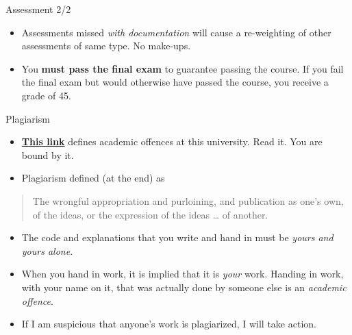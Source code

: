 \documentclass[
  ignorenonframetext,
]{beamer}
\begin{document}
\begin{frame}{Assessment 2/2}
\protect\hypertarget{assessment-22}{}

\begin{itemize}
\item
  Assessments missed \emph{with documentation} will cause a re-weighting
  of other assessments of same type. No make-ups.
\item
  You \textbf{must pass the final exam} to guarantee passing the course.
  If you fail the final exam but would otherwise have passed the course,
  you receive a grade of 45.
\end{itemize}

\end{frame}

\begin{frame}{Plagiarism}
\protect\hypertarget{plagiarism}{}

\begin{itemize}
\item
  \href{http://www.utoronto.ca/academicintegrity/academicoffenses.html}{\textbf{This
  link}} defines academic offences at this university. Read it. You are
  bound by it.
\item
  Plagiarism defined (at the end) as
\end{itemize}

\begin{quote}
The wrongful appropriation and purloining, and publication as one's own,
of the ideas, or the expression of the ideas \ldots{} of another.
\end{quote}

\begin{itemize}
\item
  The code and explanations that you write and hand in must be
  \emph{yours and yours alone}.
\item
  When you hand in work, it is implied that it is \emph{your} work.
  Handing in work, with your name on it, that was actually done by
  someone else is an \emph{academic offence}.
\item
  If I am suspicious that anyone's work is plagiarized, I will take
  action.
\end{itemize}

\end{frame}
\end{document}
